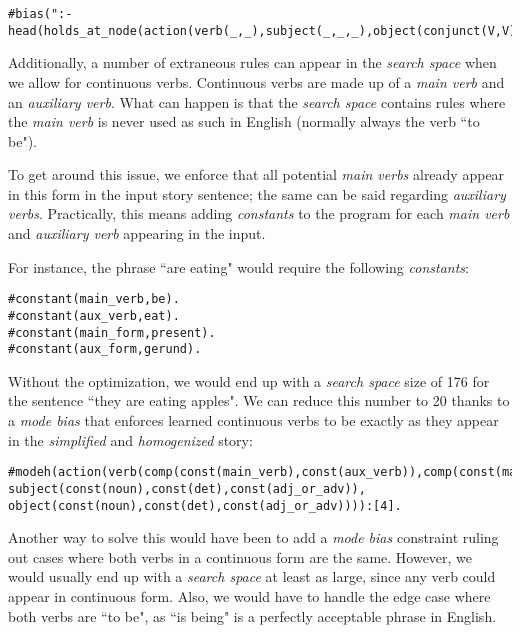 \begin{displayquote}
\begin{lstlisting}[numbers=none]
#bias(":- head(holds_at_node(action(verb(_,_),subject(_,_,_),object(conjunct(V,V),_,_)),var__(1))).").
\end{lstlisting}
\end{displayquote}

Additionally, a number of extraneous rules can appear in the \textit{search space} when we allow for continuous verbs. Continuous verbs are made up of a \textit{main verb} and an \textit{auxiliary verb}. What can happen is that the \textit{search space} contains rules where the \textit{main verb} is never used as such in English (normally always the verb ``to be").

To get around this issue, we enforce that all potential \textit{main verbs} already appear in this form in the input story sentence; the same can be said regarding \textit{auxiliary verbs}. Practically, this means adding \textit{constants} to the program for each \textit{main verb} and \textit{auxiliary verb} appearing in the input.

For instance, the phrase ``are eating" would require the following \textit{constants}:

\begin{displayquote}
\begin{lstlisting}
#constant(main_verb,be).
#constant(aux_verb,eat).
#constant(main_form,present).
#constant(aux_form,gerund).
\end{lstlisting}
\end{displayquote}

Without the optimization, we would end up with a \textit{search space} size of 176 for the sentence ``they are eating apples". We can reduce this number to 20 thanks to a \textit{mode bias} that enforces learned continuous verbs to be exactly as they appear in the \textit{simplified} and \textit{homogenized} story:

\begin{displayquote}
\begin{lstlisting}[numbers=none]
#modeh(action(verb(comp(const(main_verb),const(aux_verb)),comp(const(main_form),const(aux_form))), subject(const(noun),const(det),const(adj_or_adv)), object(const(noun),const(det),const(adj_or_adv)))):[4].
\end{lstlisting}
\end{displayquote} 

Another way to solve this would have been to add a \textit{mode bias} constraint ruling out cases where both verbs in a continuous form are the same. However, we would usually end up with a \textit{search space} at least as large, since any verb could appear in continuous form. Also, we would have to handle the edge case where both verbs are ``to be", as ``is being" is a perfectly acceptable phrase in English.

